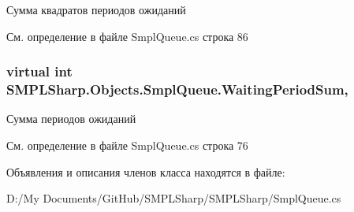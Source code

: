 Сумма квадратов периодов ожиданий 



См. определение в файле Smpl\-Queue.\-cs строка 86

\hypertarget{class_s_m_p_l_sharp_1_1_objects_1_1_smpl_queue_ac51a6ce05e36a4e6bb32462339a172e6}{
\subsubsection[{Waiting\-Period\-Sum}]{\setlength{\rightskip}{0pt plus 5cm}virtual int S\-M\-P\-L\-Sharp.\-Objects.\-Smpl\-Queue.\-Waiting\-Period\-Sum\hspace{0.3cm}{\ttfamily [get]}, {\ttfamily [set]}}}\label{d3/ded/class_s_m_p_l_sharp_1_1_objects_1_1_smpl_queue_ac51a6ce05e36a4e6bb32462339a172e6}


Сумма периодов ожиданий 



См. определение в файле Smpl\-Queue.\-cs строка 76



Объявления и описания членов класса находятся в файле\-:\begin{DoxyCompactItemize}
\item 
D\-:/\-My Documents/\-Git\-Hub/\-S\-M\-P\-L\-Sharp/\-S\-M\-P\-L\-Sharp/Smpl\-Queue.\-cs\end{DoxyCompactItemize}
